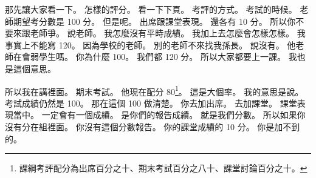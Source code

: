 \hypertarget{c01:cue:1731}{}那先讓大家看一下。
\hypertarget{c01:cue:1732}{}怎樣的評分。
\hypertarget{c01:cue:1733}{}看一下下頁。
\hypertarget{c01:cue:1734}{}考評的方式。
\hypertarget{c01:cue:1735}{}考試的時候。
\hypertarget{c01:cue:1736}{}老師期望考分數是 100 分。
\hypertarget{c01:cue:1737}{}但是呢。
\hypertarget{c01:cue:1738}{}出席跟課堂表現。
\hypertarget{c01:cue:1739}{}還各有 10 分。
\hypertarget{c01:cue:1740}{}所以你不要來跟老師爭。
\hypertarget{c01:cue:1741}{}說老師。
\hypertarget{c01:cue:1742}{}我怎麼沒有平時成績。
\hypertarget{c01:cue:1743}{}我加上去怎麼會怎樣怎樣。
\hypertarget{c01:cue:1744}{}我事實上不能寫 120。
\hypertarget{c01:cue:1745}{}因為學校的老師。
\hypertarget{c01:cue:1746}{}別的老師不來找我孫長。
\hypertarget{c01:cue:1747}{}說沒有。
\hypertarget{c01:cue:1748}{}他老師在會弱學生嗎。
\hypertarget{c01:cue:1749}{}你為什麼 100。
\hypertarget{c01:cue:1750}{}我們都 120 分。
\hypertarget{c01:cue:1751}{}所以大家都要上一課。
\hypertarget{c01:cue:1752}{}我也是這個意思。

\hypertarget{c01:cue:1753}{}所以我在講裡面。
\hypertarget{c01:cue:1754}{}期末考試。
\hypertarget{c01:cue:1755}{}他現在配分 80\footnote{課綱考評配分為出席百分之十、期末考試百分之八十、課堂討論百分之十。}。
\hypertarget{c01:cue:1756}{}這是大個率。
\hypertarget{c01:cue:1757}{}我的意思是說。
\hypertarget{c01:cue:1758}{}考試成績仍然是 100。
\hypertarget{c01:cue:1759}{}那在這個 100 做清楚。
\hypertarget{c01:cue:1760}{}你去加出席。
\hypertarget{c01:cue:1761}{}去加課堂。
\hypertarget{c01:cue:1762}{}課堂表現當中。
\hypertarget{c01:cue:1763}{}一定會有一個成績。
\hypertarget{c01:cue:1764}{}是你們的報告成績。
\hypertarget{c01:cue:1765}{}就是我們分數。
\hypertarget{c01:cue:1766}{}所以如果你沒有分在組裡面。
\hypertarget{c01:cue:1767}{}你沒有這個分數報告。
\hypertarget{c01:cue:1768}{}你的課堂成績的 10 分。
\hypertarget{c01:cue:1769}{}你是加不到的。

